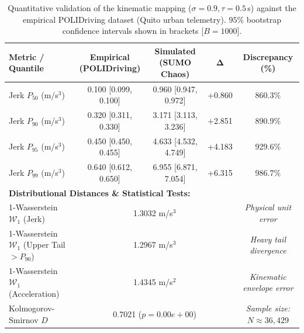 \begin{table}[t]
\centering
\caption{Quantitative validation of the kinematic mapping ($\sigma=0.9, \tau=0.5\,$s) against the empirical POLIDriving dataset (Quito urban telemetry). $95\%$ bootstrap confidence intervals shown in brackets [$B=1000$].}
\label{tab:polidriving_validation}
\begin{tabular}{lcccc}
\toprule
\textbf{Metric / Quantile} & \textbf{Empirical (POLIDriving)} & \textbf{Simulated (SUMO Chaos)} & $\boldsymbol{\Delta}$ & \textbf{Discrepancy (\%)} \\
\midrule
Jerk $P_{50}$ (m/s$^3$) & 0.100 [0.099, 0.100] & 0.960 [0.947, 0.972] & +0.860 & 860.3\% \\
Jerk $P_{90}$ (m/s$^3$) & 0.320 [0.311, 0.330] & 3.171 [3.113, 3.236] & +2.851 & 890.9\% \\
Jerk $P_{95}$ (m/s$^3$) & 0.450 [0.450, 0.455] & 4.633 [4.532, 4.749] & +4.183 & 929.6\% \\
Jerk $P_{99}$ (m/s$^3$) & 0.640 [0.612, 0.650] & 6.955 [6.871, 7.054] & +6.315 & 986.7\% \\
\midrule
\multicolumn{5}{l}{\textbf{Distributional Distances \& Statistical Tests:}} \\
1-Wasserstein $\mathcal{W}_1$ (Jerk) & \multicolumn{3}{c}{1.3032 m/s$^3$} & \textit{Physical unit error} \\
1-Wasserstein $\mathcal{W}_1$ (Upper Tail $>P_{90}$) & \multicolumn{3}{c}{1.2967 m/s$^3$} & \textit{Heavy tail divergence} \\
1-Wasserstein $\mathcal{W}_1$ (Acceleration) & \multicolumn{3}{c}{1.4345 m/s$^2$} & \textit{Kinematic envelope error} \\
Kolmogorov-Smirnov $D$ & \multicolumn{3}{c}{0.7021 ($p = 0.00e+00$)} & \textit{Sample size: $N \approx 36,429$} \\
\bottomrule
\end{tabular}
\end{table}
